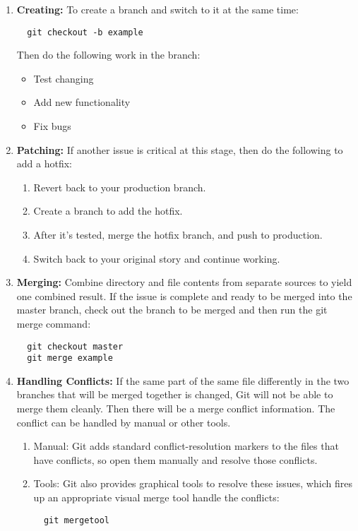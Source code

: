 \documentclass[draftclsnofoot,journal,onecolumn,12pt]{IEEEtran}
\begin{document}
\begin{enumerate}
\item \textbf{Creating:} To create a branch and switch to it at the same time:
\begin{verbatim}
  git checkout -b example
\end{verbatim}
Then do the following work in the branch:
  \begin{itemize}
    \item Test changing
    \item Add new functionality
    \item Fix bugs
  \end{itemize}
\item \textbf{Patching:} If another issue is critical at this stage, then do the following to add a hotfix:
\begin{enumerate}
  \item Revert back to your production branch.
  \item Create a branch to add the hotfix.
  \item After it’s tested, merge the hotfix branch, and push to production.
  \item Switch back to your original story and continue working.
\end{enumerate}
\item \textbf{Merging:} Combine directory and file contents from separate sources to yield one combined result. If the issue is complete and ready to be merged into the master branch, check out the branch to be merged and then run the git merge command:
\begin{verbatim}
  git checkout master
  git merge example
\end{verbatim}
\item \textbf{Handling Conflicts:} If the same part of the same file differently in the two branches that will be merged together is changed, Git will not be able to merge them cleanly. Then there will be a merge conflict information. The conflict can be handled by manual or other tools.
  \begin{enumerate}
    \item Manual: Git adds standard conflict-resolution markers to the files that have conflicts, so open them manually and resolve those conflicts.
    \item Tools: Git also provides graphical tools to resolve these issues, which fires up an appropriate visual merge tool handle the conflicts:
\begin{verbatim}
  git mergetool

\end{verbatim}
\end{enumerate}
\end{enumerate}
\end{document}
